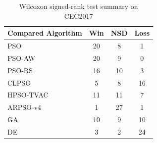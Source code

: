 \begin{table}[t]
\centering
\caption{Wilcoxon signed-rank test summary on CEC2017}
\label{tab:cec2017_wilcoxon}
\small
\begin{tabular}{lccc}
\toprule
Compared Algorithm & Win & NSD & Loss \\
\midrule
PSO & 20 & 8 & 1 \\
PSO-AW & 20 & 9 & 0 \\
PSO-RS & 16 & 10 & 3 \\
CLPSO & 5 & 8 & 16 \\
HPSO-TVAC & 11 & 11 & 7 \\
ARPSO-v4 & 1 & 27 & 1 \\
GA & 10 & 9 & 10 \\
DE & 3 & 2 & 24 \\
\bottomrule
\end{tabular}
\end{table}